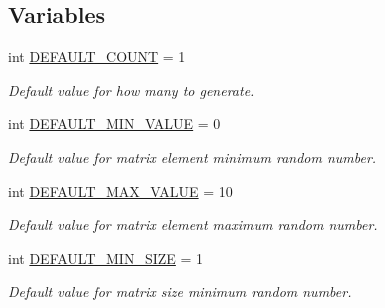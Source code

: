 \subsection*{Variables}
\begin{DoxyCompactItemize}
\item 
\mbox{\label{namespacegenerator_ad47482614306598815ef0e24e3463de1}} 
int \mbox{\hyperlink{namespacegenerator_ad47482614306598815ef0e24e3463de1}{D\+E\+F\+A\+U\+L\+T\+\_\+\+C\+O\+U\+NT}} = 1
\begin{DoxyCompactList}\small\item\em Default value for how many to generate. \end{DoxyCompactList}\item 
\mbox{\label{namespacegenerator_a8c4f0976fd6061b5da01305b2dd476a2}} 
int \mbox{\hyperlink{namespacegenerator_a8c4f0976fd6061b5da01305b2dd476a2}{D\+E\+F\+A\+U\+L\+T\+\_\+\+M\+I\+N\+\_\+\+V\+A\+L\+UE}} = 0
\begin{DoxyCompactList}\small\item\em Default value for matrix element minimum random number. \end{DoxyCompactList}\item 
\mbox{\label{namespacegenerator_a38e484a8c0585682f654d6312cdb4af5}} 
int \mbox{\hyperlink{namespacegenerator_a38e484a8c0585682f654d6312cdb4af5}{D\+E\+F\+A\+U\+L\+T\+\_\+\+M\+A\+X\+\_\+\+V\+A\+L\+UE}} = 10
\begin{DoxyCompactList}\small\item\em Default value for matrix element maximum random number. \end{DoxyCompactList}\item 
\mbox{\label{namespacegenerator_a346c332ecb6c8786ddd01a989e634777}} 
int \mbox{\hyperlink{namespacegenerator_a346c332ecb6c8786ddd01a989e634777}{D\+E\+F\+A\+U\+L\+T\+\_\+\+M\+I\+N\+\_\+\+S\+I\+ZE}} = 1
\begin{DoxyCompactList}\small\item\em Default value for matrix size minimum random number. \end{DoxyCompactList}\item 
\mbox{\label{namespacegenerator_ab7780beb5ea70ea98b607e0cbc6f7fdd}} 

\end{DoxyCompactItemize}
